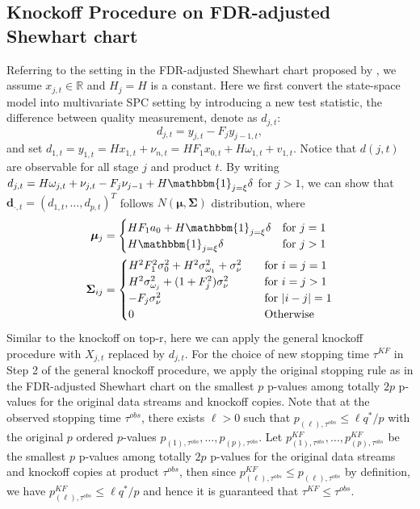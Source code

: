 \documentclass[a4paper,12pt]{article}
\begin{document}
\subsection{Knockoff Procedure on FDR-adjusted Shewhart chart}
Referring to the setting in the FDR-adjusted Shewhart chart proposed by \cite{li2009false}, we assume $x_{j,t}\in\mathbb{R}$ and $H_j=H$ is a constant. Here we first convert the state-space model into multivariate SPC setting by introducing a new test statistic, the difference between quality measurement, denote as $d_{j,t}$:
\begin{equation}\label{diff}
d_{j,t} = y_{j,t} - F_j y_{j-1,t},
\end{equation}
and set $d_{1,t} = y_{1,t} = H x_{1,t} + \nu_{n,t} = H F_1 x_{0,t} + H \omega_{1,t}+v_{1,t}$. Notice that $d(j,t)$ are observable for all stage $j$ and product $t$. By writing $d_{j,t} = H \omega_{j,t} + \nu_{j,t} - F_j \nu_{j-1} + H \mathbbm{1}_{j=\xi} \delta$ for $j>1$, we can show that $\mathbf{d}_{\cdot,t}=(d_{1,t},\ldots,d_{p,t})^T$ follows $N(\bm\mu,\bm\Sigma)$ distribution, where 
\begin{align*}
\bm \mu_{j} &= 
\begin{cases}
H F_1 a_0 + H \mathbbm{1}_{j=\xi} \delta & \text{for }j = 1 \\
H \mathbbm{1}_{j=\xi} \delta & \text{for }j > 1
\end{cases} \\
\bm \Sigma_{ij} &=
\begin{cases}
H^2 F_1^2 \sigma_0^2 + H^2 \sigma^2_{\omega_1}  + \sigma^2_{\nu} & \quad \text{for }i = j =1\\
H^2 \sigma^2_{\omega_j} +(1 + F_j^2 ) \sigma^2_{\nu} &\quad \text{for } i=j>1 \\
- F_j \sigma^2_{\nu} &\quad \text{for } |i-j| =1\\
0& \quad \text{Otherwise}
\end{cases}
\end{align*}
Similar to the knockoff on top-r, here we can apply the general knockoff procedure with $X_{j,t}$ replaced by $d_{j,t}$. For the choice of new stopping time $\tau^{KF}$ in Step 2 of the general knockoff procedure, we apply the original stopping rule as in the FDR-adjusted Shewhart chart on the smallest $p$ p-values among totally $2p$ p-values for the original data streams and knockoff copies. Note that at the observed stopping time $\tau^{obs}$, there exists $\ell>0$ such that $p_{(\ell),\tau^{obs}}\leq \ell q^*/p$ with the original $p$ ordered $p$-values $p_{(1),\tau^{obs}},\ldots,p_{(p),\tau^{obs}}$. Let $p_{(1),\tau^{obs}}^{KF},\ldots,p_{(p),\tau^{obs}}^{KF}$ be the smallest $p$ p-values among totally $2p$ p-values for the original data streams and knockoff copies at product $\tau^{obs}$, then since $p_{(\ell),\tau^{obs}}^{KF}\leq p_{(\ell),\tau^{obs}}$ by definition, we have $p_{(\ell),\tau^{obs}}^{KF}\leq \ell q^*/p$ and hence it is guaranteed that $\tau^{KF} \le \tau^{obs}$. 
\end{document}
